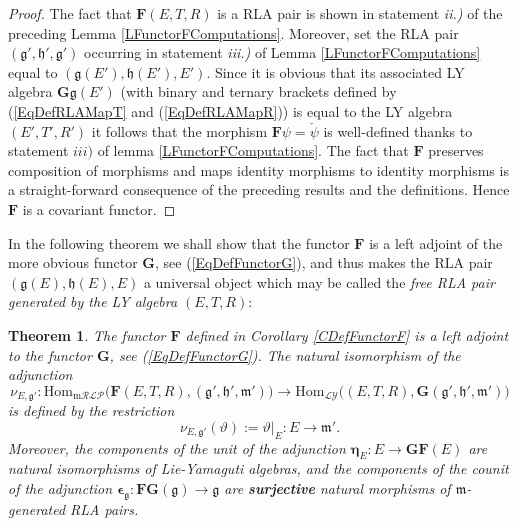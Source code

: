 \documentclass [11pt] {article}
\newtheorem {theorem} [lemma] {Theorem}
\theoremstyle{definition}
\begin{document}
\begin{proof}
	The fact that $\mathbf{F}(E,T,R)$ is a RLA pair is
	shown in statement \textit{ii.)} of the preceding
	Lemma \ref{LFunctorFComputations}. Moreover,
	set the RLA pair $(\mathfrak{g}',\mathfrak{h}',\mathfrak{g}')$ occurring in statement \textit{iii.)} of Lemma
	\ref{LFunctorFComputations} equal to
	$(\mathfrak{g}(E'),\mathfrak{h}(E'),E')$. Since it is obvious that its associated LY algebra $\mathbf{G}\mathfrak{g}(E')$ (with binary and ternary brackets defined by (\ref{EqDefRLAMapT} and (\ref{EqDefRLAMapR}))
	 is equal to the LY algebra $(E',T',R')$ it follows that the morphism $\mathbf{F}\psi=\check{\psi}$ is well-defined thanks to statement $iii)$ of lemma \ref{LFunctorFComputations}. The fact that $\mathbf{F}$ preserves composition of morphisms and maps identity morphisms to identity morphisms is a straight-forward consequence of the preceding results and the definitions.
	Hence $\mathbf{F}$ is a covariant functor.
\end{proof}
\noindent In the following theorem we shall show that the functor
$\mathbf{F}$ is a left adjoint of the more obvious functor $\mathbf{G}$, see
  (\ref{EqDefFunctorG}),
and thus makes the RLA pair $(\mathfrak{g}(E),\mathfrak{h}(E),E)$ a universal object
which may be called the \textit{free RLA pair generated by the LY algebra $(E,T,R)$}:
\begin{theorem}\label{TPrincipal}
  The functor $\mathbf{F}$ defined in Corollary \ref{CDefFunctorF}
   is a left adjoint to the functor $\mathbf{G}$, see
  (\ref{EqDefFunctorG}). The natural
  isomorphism of the adjunction
  \begin{equation}
   \nu_{E,\mathfrak{g}'}:\label{EqDefAdjugantKModules}
   \mathrm{Hom}_{\mathrm{m}\mathcal{RLP}}\big(\mathbf{F}(E,T,R),
     (\mathfrak{g}',\mathfrak{h}',\mathfrak{m}')\big)
     \to
    \mathrm{Hom}_\mathcal{LY}
       \big((E,T,R),\mathbf{G}(\mathfrak{g}',\mathfrak{h}',\mathfrak{m}')\big) 
  \end{equation}
  is defined by the restriction
  \begin{equation}\label{EqDefAdjugantElements}
   \nu_{E,\mathfrak{g}'}(\vartheta):=\vartheta|_{E}:E\to 
   \mathfrak{m}'.
  \end{equation}
  Moreover, the components of the unit of the adjunction 
  $\boldsymbol{\eta}_E:E\to \mathbf{GF}(E)$ are natural isomorphisms of
  Lie-Yamaguti algebras, and the components of the counit of the adjunction $\boldsymbol{\epsilon}_{\mathfrak{g}}:\mathbf{FG}(\mathfrak{g})
  \to\mathfrak{g}$ are \textbf{surjective} natural morphisms of 
  $\mathfrak{m}$-generated RLA pairs.
\end{theorem}
\end{document}
